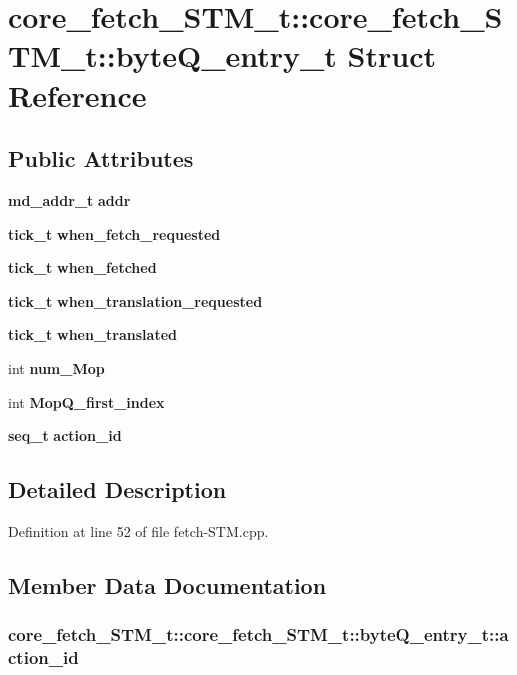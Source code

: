 \section{core\_\-fetch\_\-STM\_\-t::core\_\-fetch\_\-STM\_\-t::byteQ\_\-entry\_\-t Struct Reference}
\label{structcore__fetch__STM__t_1_1byteQ__entry__t}
\subsection*{Public Attributes}
\begin{CompactItemize}
\item 
{\bf md\_\-addr\_\-t} {\bf addr}
\item 
{\bf tick\_\-t} {\bf when\_\-fetch\_\-requested}
\item 
{\bf tick\_\-t} {\bf when\_\-fetched}
\item 
{\bf tick\_\-t} {\bf when\_\-translation\_\-requested}
\item 
{\bf tick\_\-t} {\bf when\_\-translated}
\item 
int {\bf num\_\-Mop}
\item 
int {\bf MopQ\_\-first\_\-index}
\item 
{\bf seq\_\-t} {\bf action\_\-id}
\end{CompactItemize}


\subsection{Detailed Description}


Definition at line 52 of file fetch-STM.cpp.

\subsection{Member Data Documentation}
\subsubsection[{action\_\-id}]{ core\_\-fetch\_\-STM\_\-t::core\_\-fetch\_\-STM\_\-t::byteQ\_\-entry\_\-t::action\_\-id}\label{structcore__fetch__STM__t_1_1byteQ__entry__t_073f54a7249f0ff1ec47b2f08899867b}




